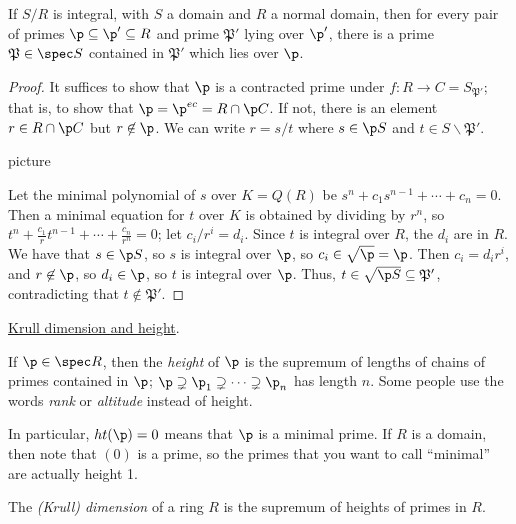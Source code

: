  \begin{theorem}
   If $S/R$ is integral, with $S$ a domain and $R$ a normal domain, then for every pair
   of primes $\p\subseteq \p'\subseteq R$ and prime $\mathfrak{P}'$ lying over $\p'$,
   there is a prime $\mathfrak{P}\in \spec S$ contained in $\mathfrak{P}'$ which lies
   over $\p$.
 \end{theorem}
 \begin{proof}
   It suffices to show that $\p$ is a contracted prime under $f:R\to
   C=S_{\mathfrak{P}'}$; that is, to show that $\p=\p^{ec}=R\cap \p C$. If not, there is
   an element $r\in R\cap \p C$ but $r\not\in \p$. We can write $r= s/t$ where $s\in \p
   S$ and $t\in S\smallsetminus \mathfrak{P}'$.

   picture

   Let the minimal polynomial of $s$ over $K=Q(R)$ be $s^n+c_1s^{n-1}+\cdots + c_n=0$.
   Then a minimal equation for $t$ over $K$ is obtained by dividing by $r^n$, so
   $t^n+\frac{c_1}{r} t^{n-1} + \cdots + \frac{c_n}{r^n}=0$; let $c_i/r^i=d_i$. Since $t$
   is integral over $R$, the $d_i$ are in $R$. We have that $s\in \p S$, so $s$ is
   integral over $\p$, so $c_i\in \sqrt \p=\p$. Then $c_i=d_i r^i$, and $r\not\in \p$, so
   $d_i\in \p$, so $t$ is integral over $\p$. Thus, $t\in \sqrt {\p S}\subseteq
   \mathfrak{P}'$, contradicting that $t\not\in \mathfrak{P}'$.
 \end{proof}

 \underline{Krull dimension and height}.
 \begin{definition}
   If $\p\in \spec R$, then the \emph{height} of $\p$ is the supremum of lengths of
   chains of primes contained in $\p$; $\p\supsetneq \p_1\supsetneq \cdots\supsetneq
   \p_n$ has length $n$. Some people use the words \emph{rank} or \emph{altitude} instead
   of height.
 \end{definition}
 In particular, $ht(\p)=0$ means that $\p$ is a minimal prime. If $R$ is a domain, then
 note that $(0)$ is a prime, so the primes that you want to call ``minimal'' are actually
 height 1.
 \begin{definition}
   The \emph{(Krull) dimension} of a ring $R$ is the supremum of heights of primes in
   $R$.
 \end{definition}

